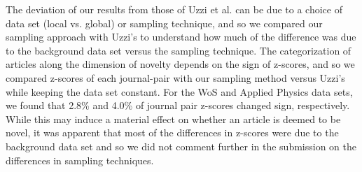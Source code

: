 \documentclass[11pt, oneside]{article}   	%
\begin{document}
The deviation of our results from those of Uzzi et al. can be due to a choice of data set (local vs. global) or sampling technique, and so we compared our sampling approach with Uzzi's to understand how much of the difference was due to the background data set versus the sampling technique. The categorization of articles along the dimension of novelty depends on the sign of z-scores, and so we compared z-scores of each journal-pair with our sampling method versus Uzzi's while keeping  the data set constant.  For the WoS and Applied Physics data sets, we found that 2.8\% and 4.0\% of journal pair z-scores changed sign, respectively.  While this may induce a material effect on whether an article is deemed to be novel, it was apparent that most of the differences in z-scores were due to the background data set and so we did not comment further in the submission on the differences in sampling techniques.
\end{document}
